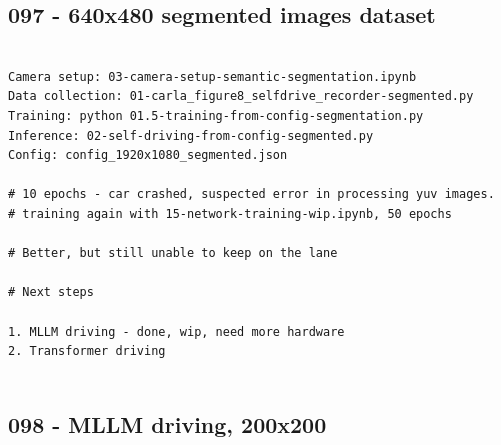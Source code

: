\subsection{097 - 640x480 segmented images dataset}
\label{app_res:097}


\begin{verbatim}

Camera setup: 03-camera-setup-semantic-segmentation.ipynb
Data collection: 01-carla_figure8_selfdrive_recorder-segmented.py 
Training: python 01.5-training-from-config-segmentation.py 
Inference: 02-self-driving-from-config-segmented.py
Config: config_1920x1080_segmented.json 

# 10 epochs - car crashed, suspected error in processing yuv images.
# training again with 15-network-training-wip.ipynb, 50 epochs

# Better, but still unable to keep on the lane

# Next steps

1. MLLM driving - done, wip, need more hardware
2. Transformer driving 


\end{verbatim}

\subsection{098 - MLLM driving, 200x200}
\label{app_res:098}

